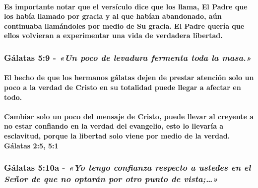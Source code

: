 \documentclass[11a pt,twoside]{article}
\newcommand{\scripture}[1]{%
  {\fontsize{12pt}{16pt}\selectfont\ScriptureFont\itshape #1}%
}
\let\oldsubsubsection\subsubsection
\renewcommand{\subsubsection}{\needspace{4\baselineskip}\oldsubsubsection}
\let\oldparagraph\paragraph
\renewcommand{\paragraph}{\needspace{3\baselineskip}\oldparagraph}
\begin{document}
\paragraph{Es importante notar que el versículo dice que los llama, El
Padre que los había llamado por gracia y al que habían abandonado, aún
continuaba llamándoles por medio de Su gracia. El Padre quería que ellos
volvieran a experimentar una vida de verdadera
libertad.}\label{es-importante-notar-que-el-versuxedculo-dice-que-los-llama-el-padre-que-los-habuxeda-llamado-por-gracia-y-al-que-habuxedan-abandonado-auxfan-continuaba-llamuxe1ndoles-por-medio-de-su-gracia.-el-padre-queruxeda-que-ellos-volvieran-a-experimentar-una-vida-de-verdadera-libertad.}

\subsubsection{\texorpdfstring{Gálatas 5:9 -
\scripture{«Un poco de levadura fermenta toda la masa.»}}{Gálatas 5:9 - }}\label{guxe1latas-59---un-poco-de-levadura-fermenta-toda-la-masa.}

\paragraph{El hecho de que los hermanos gálatas dejen de prestar
atención solo un poco a la verdad de Cristo en su totalidad puede llegar
a afectar en
todo.}\label{el-hecho-de-que-los-hermanos-guxe1latas-dejen-de-prestar-atenciuxf3n-solo-un-poco-a-la-verdad-de-cristo-en-su-totalidad-puede-llegar-a-afectar-en-todo.}

\paragraph{Cambiar solo un poco del mensaje de Cristo, puede llevar al
creyente a no estar confiando en la verdad del evangelio, esto lo
llevaría a esclavitud, porque la libertad solo viene por medio de la
verdad. Gálatas 2:5,
5:1}\label{cambiar-solo-un-poco-del-mensaje-de-cristo-puede-llevar-al-creyente-a-no-estar-confiando-en-la-verdad-del-evangelio-esto-lo-llevaruxeda-a-esclavitud-porque-la-libertad-solo-viene-por-medio-de-la-verdad.-guxe1latas-25-51}

\subsubsection{\texorpdfstring{Gálatas 5:10a -
\scripture{«Yo tengo confianza respecto a ustedes en el Señor de que no optarán por otro punto de vista;…»}}{Gálatas 5:10a - }}\label{guxe1latas-510a---yo-tengo-confianza-respecto-a-ustedes-en-el-seuxf1or-de-que-no-optaruxe1n-por-otro-punto-de-vista}
\end{document}
